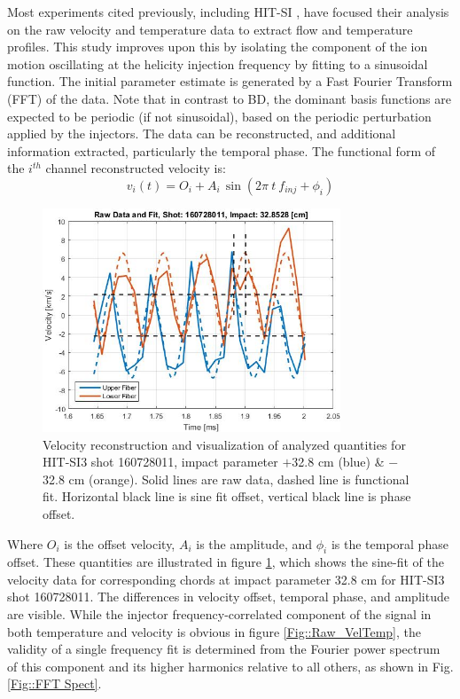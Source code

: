 Most experiments cited previously, including HIT-SI \cite{Hossack_HitSi3}, have focused their analysis on the raw velocity and temperature data to extract flow and temperature profiles. This study improves upon this by isolating the component of the ion motion oscillating at the helicity injection frequency by fitting to a sinusoidal function. The initial parameter estimate is generated by a Fast Fourier Transform (FFT) of the data. Note that in contrast to BD, the dominant basis functions are expected to be periodic (if not sinusoidal), based on the periodic perturbation applied by the injectors. The data can be reconstructed, and additional information extracted, particularly the temporal phase. The functional form of the $i^{th}$ channel reconstructed velocity is:
\begin{equation}\label{Eqn::Fit_Fn}
v_i(t)=O_i+A_i\,\mathrm{\sin}(2{\pi}\:t\:f_{inj}+\phi_i)
\end{equation}
\begin{figure}
\includegraphics[width=3.5in]{ReconstExplain}\caption{Velocity reconstruction and visualization of analyzed quantities for HIT-SI3 shot 160728011, impact parameter $+$32.8 cm (blue) \& $-$32.8 cm (orange). Solid lines are raw data, dashed line is functional fit. Horizontal black line is sine fit offset, vertical black line is phase offset.}\label{Fig::Reconst Explain}
\end{figure}
Where $O_i$ is the offset velocity, $A_i$ is the amplitude, and $\phi_i$ is the temporal phase offset. These quantities are illustrated in figure \ref{Fig::Reconst Explain}, which shows the sine-fit of the velocity data for corresponding chords at impact parameter 32.8 cm for HIT-SI3 shot 160728011. The differences in velocity offset, temporal phase, and amplitude are visible. While the injector frequency-correlated component of the signal in both temperature and velocity is obvious in figure \ref{Fig::Raw_VelTemp}, the validity of a single frequency fit is determined from the Fourier power spectrum of this component and its higher harmonics relative to all others, as shown in Fig.\ref{Fig::FFT Spect}.
